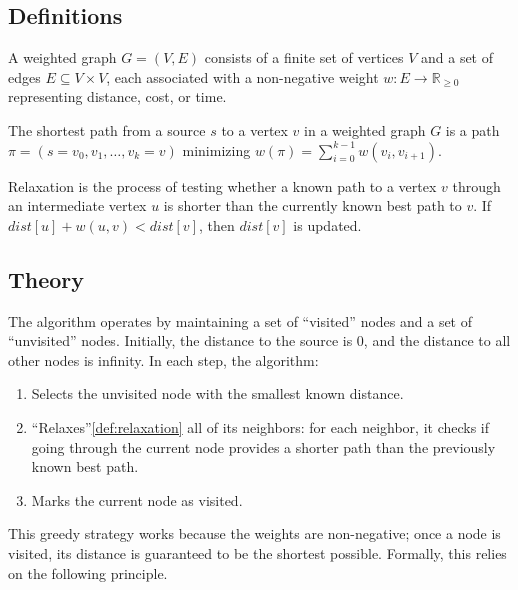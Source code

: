 \subsection{Definitions}
\begin{definition}[Graph]\label{def:graph}
A weighted graph $G = (V, E)$ consists of a finite set of vertices $V$ and a set of edges $E \subseteq V \times V$, each associated with a non-negative weight $w: E \to \mathbb{R}_{\ge 0}$ representing distance, cost, or time.
\end{definition}

\begin{definition}\label{def:shortest_path}
The shortest path from a source $s$ to a vertex $v$ in a weighted graph $G$ is a path $\pi = (s = v_0, v_1, \ldots, v_k = v)$ minimizing $w(\pi) = \sum_{i=0}^{k-1} w(v_i, v_{i+1})$.
\end{definition}

\begin{definition}[Relaxation]\label{def:relaxation}
Relaxation is the process of testing whether a known path to a vertex $v$ through an intermediate vertex $u$ is shorter than the currently known best path to $v$. If $dist[u] + w(u,v) < dist[v]$, then $dist[v]$ is updated.
\end{definition}

\subsection{Theory}
The algorithm operates by maintaining a set of ``visited'' nodes and a set of ``unvisited'' nodes. Initially, the distance to the source is 0, and the distance to all other nodes is infinity. In each step, the algorithm:
\begin{enumerate}
  \item Selects the unvisited node with the smallest known distance.
  \item ``Relaxes''\cref{def:relaxation} all of its neighbors: for each neighbor, it checks if going through the current node provides a shorter path than the previously known best path.
  \item Marks the current node as visited.
\end{enumerate}

This greedy strategy works because the weights are non-negative; once a node is visited, its distance is guaranteed to be the shortest possible. Formally, this relies on the following principle.

